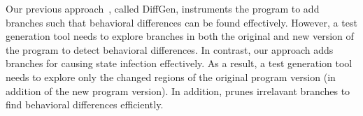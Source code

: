 Our previous approach~\cite{taneja08:diffgen}, called DiffGen, instruments the program to add branches such that 
behavioral differences can be found effectively. However, a test generation tool needs to explore branches in 
both the original and new version of the program to detect behavioral differences. 
In contrast, our approach adds branches for causing state infection effectively.  
As a result, a test generation tool
needs to explore only the changed regions of the original program version (in addition of the 
new program version).
In addition,  prunes irrelavant branches to find behavioral differences efficiently. 
%



